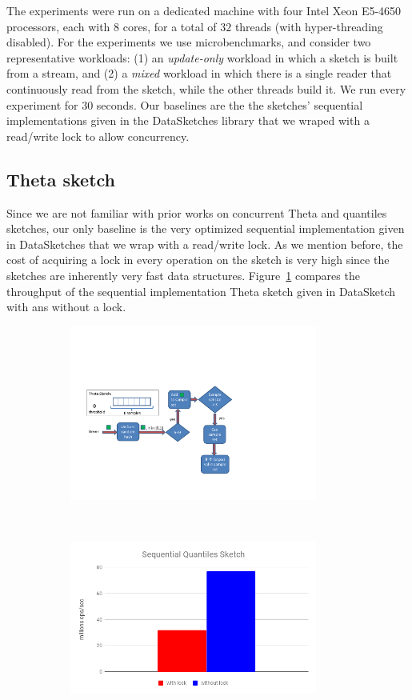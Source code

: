 The experiments were run on a dedicated machine with four Intel
Xeon E5-4650 processors, each with $8$ cores, for a total of
$32$ threads (with hyper-threading disabled).
For the experiments we use microbenchmarks, and consider two
representative workloads: (1) an \emph{update-only} workload in
which a sketch is built from a stream, and (2) a \emph{mixed}
workload in which there is a single reader that continuously read
from the sketch, while the other threads build it.
We run every experiment for 30 seconds. 
Our baselines are the the sketches' sequential implementations
given in the DataSketches library that we wraped with a read/write lock
to allow concurrency.

\subsection{Theta sketch}
\label{sub:thetaExp}

Since we are not familiar with prior works on concurrent Theta
and quantiles sketches, our only baseline is the very optimized
sequential implementation given in DataSketches that we wrap with
a read/write lock.
As we mention before, the cost of acquiring a lock in every
operation on the sketch is very high since the sketches are
inherently very fast data structures.
Figure~\ref{fig:LockIsBadTheta} compares the throughput of the
sequential implementation Theta sketch given in DataSketch with
ans without a lock.

\begin{figure}[t!]
    \centering
    \begin{subfigure}[t]{0.49\textwidth}
        \centering
        \includegraphics[width=3.2in]{images/seqTheta}
        \caption{}
        \label{fig:LockIsBadTheta}
    \end{subfigure}%
    ~ 
    \begin{subfigure}[t]{0.49\textwidth}
        \centering
        \includegraphics[width=3.2in]{images/seqQuantiles}
        \caption{}
        \label{fig:LockIsBadQuantiles}
    \end{subfigure}
    \caption{}
    \label{fig:sequntial}
\end{figure}

